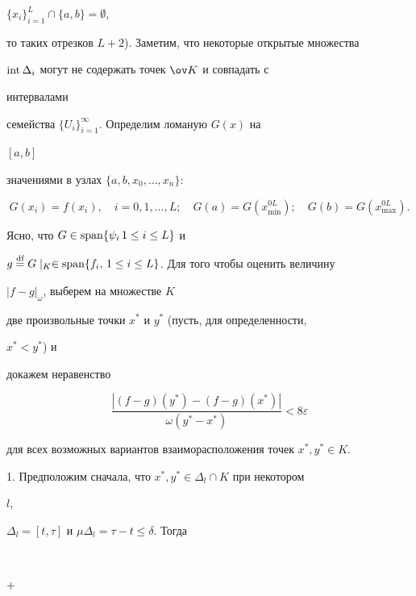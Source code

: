 \begin{pf}
$\{x_i\}^L_{i=1}\cap\{a,b\}=\emptyset$,


то таких отрезков $L+2$). Заметим, что некоторые открытые множества


$\text{int\,}\Delta_i$ могут не содержать точек $\ov K$ и совпадать с


интервалами


семейства $\{U_i\}^\infty_{i=1}$. Определим ломаную $G(x)$ на


$[a,b]$


значениями в узлах $\{a,b,x_0,\dotsc,x_n\}$:


\begin{equation}


G(x_i)=f(x_i),\quad i=0,1,\dotsc,L;\quad


G(a)=G(x^{0L}_{\min});\quad


G(b)=G(x^{0L}_{\max}).


\end{equation}


Ясно, что $G\in\operatorname{span}\{\psi_i\,1\le i\le L\}$ и


$g\overset{\text{df}}{=}{}


G\mid_K\in\Span\{f_i,\,1\le i\le L\}$. Для того чтобы оценить величину


$|f-g|_\omega$, выберем на множестве $K$


две произвольные точки $x^*$ и $y^*$ (пусть, для определенности,


$x^*<y^*$) и


докажем неравенство


\begin{equation}


\frac{|(f-g)(y^*)-(f-g)(x^*)|}


{\omega(y^*-x^*)}<8\varepsilon


\end{equation}


для всех возможных вариантов взаиморасположения точек $x^*,y^*\in K$.





1. Предположим сначала, что $x^*,y^*\in\Delta_l\cap K$ при некотором


$l$,


$\Delta_l=[t,\tau]$ и $\mu\Delta_l=\tau-t\le \delta$. Тогда


$$


 \le


 +



\end{pf}
